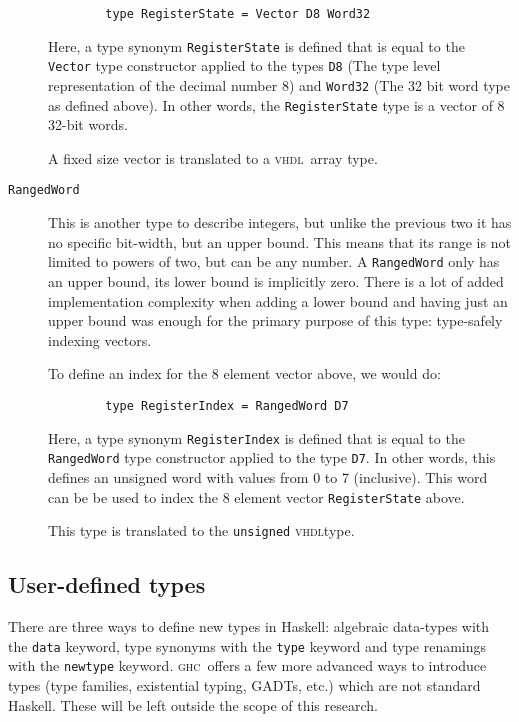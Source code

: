 \documentclass[conference,pdf,a4paper,10pt,final,twoside,twocolumn]{IEEEtran}
\def\VHDL{\textsc{vhdl}}
\def\GHC{\textsc{ghc}}
\def\hs#1{\texttt{#1}}
\begin{document}
\begin{description}
        \begin{verbatim}
        type RegisterState = Vector D8 Word32
        \end{verbatim}

        Here, a type synonym \hs{RegisterState} is defined that is equal to
        the \hs{Vector} type constructor applied to the types \hs{D8} (The type
        level representation of the decimal number 8) and \hs{Word32} (The 32
        bit word type as defined above). In other words, the
        \hs{RegisterState} type is a vector of 8 32-bit words.

        A fixed size vector is translated to a \VHDL\ array type.
      \item[\hs{RangedWord}]
        This is another type to describe integers, but unlike the previous
        two it has no specific bit-width, but an upper bound. This means that
        its range is not limited to powers of two, but can be any number.
        A \hs{RangedWord} only has an upper bound, its lower bound is
        implicitly zero. There is a lot of added implementation complexity
        when adding a lower bound and having just an upper bound was enough
        for the primary purpose of this type: type-safely indexing vectors.

        To define an index for the 8 element vector above, we would do:

        \begin{verbatim}
        type RegisterIndex = RangedWord D7
        \end{verbatim}

        Here, a type synonym \hs{RegisterIndex} is defined that is equal to
        the \hs{RangedWord} type constructor applied to the type \hs{D7}. In
        other words, this defines an unsigned word with values from
        0 to 7 (inclusive). This word can be be used to index the
        8 element vector \hs{RegisterState} above.

        This type is translated to the \texttt{unsigned} \VHDL type.
    \end{description}
  \subsection{User-defined types}
    There are three ways to define new types in Haskell: algebraic
    data-types with the \hs{data} keyword, type synonyms with the \hs{type}
    keyword and type renamings with the \hs{newtype} keyword. \GHC\
    offers a few more advanced ways to introduce types (type families,
    existential typing, \small{GADT}s, etc.) which are not standard
    Haskell.  These will be left outside the scope of this research.
\end{document}

